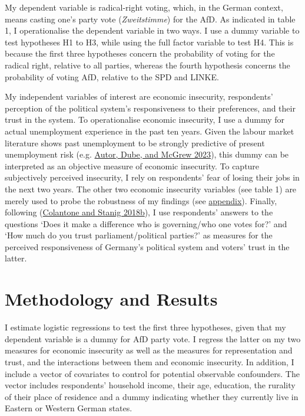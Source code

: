 \documentclass[
]{article}
\begin{document}
My dependent variable is radical-right voting, which, in the German
context, means casting one's party vote (\emph{Zweitstimme}) for the
AfD. As indicated in table 1, I operationalise the dependent variable in
two ways. I use a dummy variable to test hypotheses H1 to H3, while
using the full factor variable to test H4. This is because the first
three hypotheses concern the probability of voting for the radical
right, relative to all parties, whereas the fourth hypothesis concerns
the probability of voting AfD, relative to the SPD and LINKE.

My independent variables of interest are economic insecurity,
respondents' perception of the political system's responsiveness to
their preferences, and their trust in the system. To operationalise
economic insecurity, I use a dummy for actual unemployment experience in
the past ten years. Given the labour market literature shows past
unemployment to be strongly predictive of present unemployment risk
(e.g. \protect\hyperlink{ref-autor_unexpected_2023}{Autor, Dube, and
McGrew 2023}), this dummy can be interpreted as an objective measure of
economic insecurity. To capture subjectively perceived insecurity, I
rely on respondents' fear of losing their jobs in the next two years.
The other two economic insecurity variables (see table 1) are merely
used to probe the robustness of my findings (see
\protect\hyperlink{appendix}{appendix}). Finally, following
(\protect\hyperlink{ref-colantone_global_2018}{Colantone and Stanig
2018b}), I use respondents' answers to the questions `Does it make a
difference who is governing/who one votes for?' and `How much do you
trust parliament/political parties?' as measures for the perceived
responsiveness of Germany's political system and voters' trust in the
latter.

\hypertarget{methodology-and-results}{%
\section{Methodology and Results}\label{methodology-and-results}}

I estimate logistic regressions to test the first three hypotheses,
given that my dependent variable is a dummy for AfD party vote. I
regress the latter on my two measures for economic insecurity as well as
the measures for representation and trust, and the interactions between
them and economic insecurity. In addition, I include a vector of
covariates to control for potential observable confounders. The vector
includes respondents' household income, their age, education, the
rurality of their place of residence and a dummy indicating whether they
currently live in Eastern or Western German states.
\end{document}
